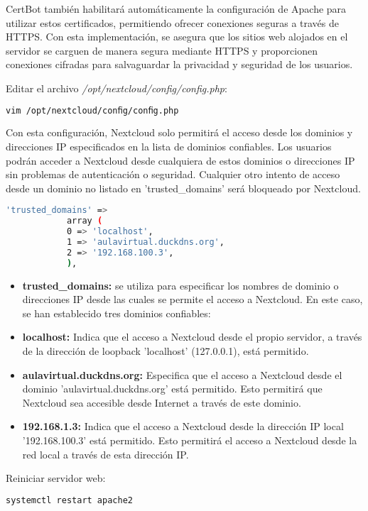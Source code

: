 \begin{enumerate}
			CertBot también habilitará automáticamente la configuración de Apache para utilizar estos certificados, permitiendo ofrecer conexiones seguras a través de HTTPS. Con esta implementación, se asegura que los sitios web alojados en el servidor se carguen de manera segura mediante HTTPS y proporcionen conexiones cifradas para salvaguardar la privacidad y seguridad de los usuarios.
			
	
			Editar el archivo \textit{/opt/nextcloud/conﬁg/conﬁg.php}:
			
			\begin{lstlisting}[language=Bash,caption=Directorio de trabajo NextCloud]
			vim /opt/nextcloud/conﬁg/conﬁg.php
			\end{lstlisting}
				
		
			Con esta configuración, Nextcloud solo permitirá el acceso desde los dominios y direcciones IP especificados en la lista de dominios confiables. Los usuarios podrán acceder a Nextcloud desde cualquiera de estos dominios o direcciones IP sin problemas de autenticación o seguridad. Cualquier otro intento de acceso desde un dominio no listado en 'trusted\_domains' será bloqueado por Nextcloud.
		
			\begin{lstlisting}[language=Bash,caption=Directorio de trabajo NextCloud]
			'trusted_domains' =>
			array (
			0 => 'localhost',
			1 => 'aulavirtual.duckdns.org',
			2 => '192.168.100.3',
			),
			\end{lstlisting}
		
		\begin{itemize}
			\item \textbf{trusted\_domains:} se utiliza para especificar los nombres de dominio o direcciones IP desde las cuales se permite el acceso a Nextcloud. En este caso, se han establecido tres dominios confiables:
			
			\item \textbf{localhost:} Indica que el acceso a Nextcloud desde el propio servidor, a través de la dirección de loopback 'localhost' (127.0.0.1), está permitido.
				
			\item \textbf{aulavirtual.duckdns.org:} Especifica que el acceso a Nextcloud desde el dominio 'aulavirtual.duckdns.org' está permitido. Esto permitirá que Nextcloud sea accesible desde Internet a través de este dominio.
				
			\item \textbf{192.168.1.3:} Indica que el acceso a Nextcloud desde la dirección IP local '192.168.100.3' está permitido. Esto permitirá el acceso a Nextcloud desde la red local a través de esta dirección IP.

		\end{itemize}
		

		
		
		Reiniciar servidor web:
		\begin{lstlisting}[language=Bash,caption=Directorio de trabajo NextCloud]
		systemctl restart apache2
		\end{lstlisting}

		\end{enumerate}
		

